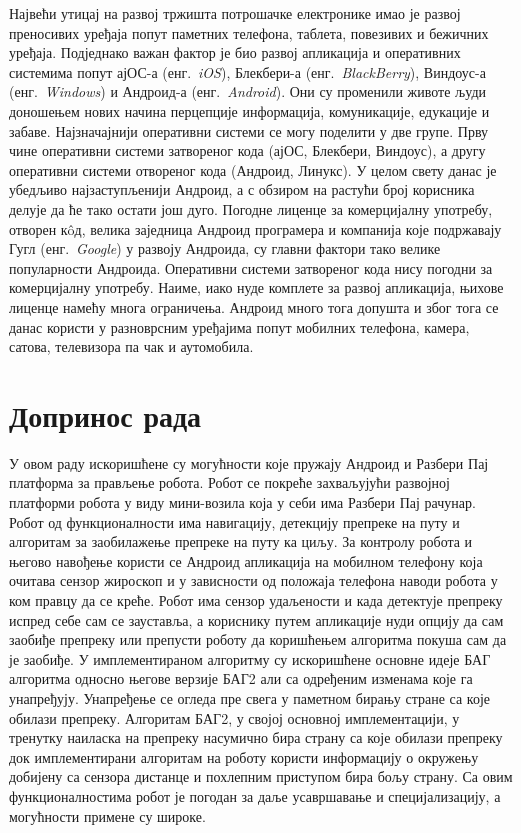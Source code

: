 \documentclass[12pt,oneside]{memoir}
\theoremstyle{remark}
\begin{document}
Највећи утицај на развој тржишта потрошачке електронике имао је развој преносивих уређаја попут паметних телефона, таблета, повезивих и бежичних уређаја. Подједнако важан фактор је био развој апликација и оперативних системима попут ајОС-а (енг.~{\em iOS}), Блекбери-а (енг.~{\em BlackBerry}), Виндоус-а (енг.~{\em Windows}) и Андроид-а (енг.~{\em Android}). Они су променили животе људи доношењем нових начина перцепције информација, комуникације, едукације и забаве. Најзначајнији оперативни системи се могу поделити у две групе. Прву чине оперативни системи затвореног кода (ајОС, Блекбери, Виндоус), а другу оперативни системи отвореног кода (Андроид, Линукс). У целом свету данас је убедљиво најзаступљенији Андроид, а с обзиром на растући број корисника делује да ће тако остати још дуго. Погодне лиценце за комерцијалну употребу, отворен к\^{o}д, велика заједница Андроид програмера и компанија које подржавају Гугл (енг.~{\em Google}) у развоју Андроида, су главни фактори тако велике популарности Андроида. Оперативни системи затвореног кода нису погодни за комерцијалну употребу. Наиме, иако нуде комплете за развој апликација, њихове лиценце намећу многа ограничења. Андроид много тога допушта  и због тога се данас користи у разноврсним уређајима попут мобилних телефона, камера, сатова, телевизора па чак и аутомобила.

\section{Допринос рада}
У овом раду искоришћене су могућности које пружају Андроид и Разбери Пај платформа за прављење робота. Робот се покреће захваљујући развојној платформи робота у виду мини-возила која у себи има Разбери Пај рачунар. Робот од функционалности има навигацију, детекцију препреке на путу и алгоритам за заобилажење препреке на путу ка циљу. За контролу робота и његово навођење користи се Андроид апликација на мобилном телефону која очитава сензор жироскоп и у зависности од положаја телефона наводи робота у ком правцу да се креће. Робот има сензор удаљености и када детектује препреку испред себе сам се зауставља, а кориснику путем апликације нуди опцију да сам заобиђе препреку или препусти роботу да коришћењем алгоритма покуша сам да је заобиђе. У имплементираном алгоритму су искоришћене основне идеје БАГ алгоритма односно његове верзије БАГ2 али са одређеним изменама које га унапређују. Унапређење се огледа пре свега у паметном бирању стране са које обилази препреку. Алгоритам БАГ2, у својој основној имплементацији, у тренутку наиласка на препреку насумично бира страну са које обилази препреку док имплементирани алгоритам на роботу користи информацију о окружењу добијену са сензора дистанце и похлепним приступом бира бољу страну. Са овим функционалностима робот је погодан за даље усавршавање и специјализацију, а могућности примене су широке. 
\end{document}
